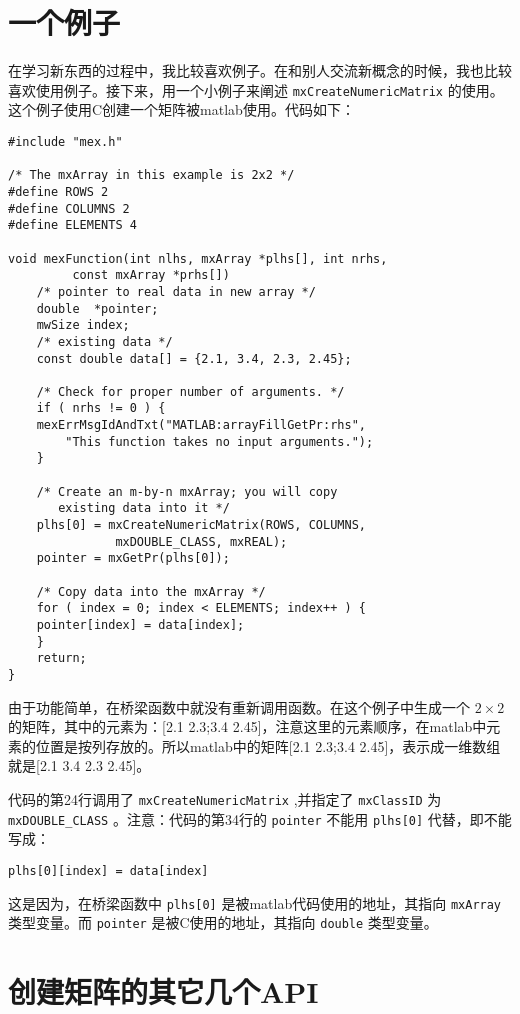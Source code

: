 \documentclass[10pt,a4paper,UTF8]{article}
\begin{document}
\section{一个例子}
\label{sec:orgheadline3}


在学习新东西的过程中，我比较喜欢例子。在和别人交流新概念的时候，我也比较喜欢使用例子。接下来，用一个小例子来阐述 \texttt{mxCreateNumericMatrix} 的使用。这个例子使用C创建一个矩阵被matlab使用。代码如下：
\lstset{language=C,label= ,caption= ,captionpos=b,numbers=left}
\begin{lstlisting}
#include "mex.h"

/* The mxArray in this example is 2x2 */
#define ROWS 2
#define COLUMNS 2
#define ELEMENTS 4

void mexFunction(int nlhs, mxArray *plhs[], int nrhs,
		 const mxArray *prhs[])
    /* pointer to real data in new array */
    double  *pointer;
    mwSize index;
    /* existing data */
    const double data[] = {2.1, 3.4, 2.3, 2.45};

    /* Check for proper number of arguments. */
    if ( nrhs != 0 ) {
	mexErrMsgIdAndTxt("MATLAB:arrayFillGetPr:rhs",
	    "This function takes no input arguments.");
    }

    /* Create an m-by-n mxArray; you will copy
       existing data into it */
    plhs[0] = mxCreateNumericMatrix(ROWS, COLUMNS,
			   mxDOUBLE_CLASS, mxREAL);
    pointer = mxGetPr(plhs[0]);

    /* Copy data into the mxArray */
    for ( index = 0; index < ELEMENTS; index++ ) {
	pointer[index] = data[index];
    }
    return;
}
\end{lstlisting}

由于功能简单，在桥梁函数中就没有重新调用函数。在这个例子中生成一个 \(2\times 2\)的矩阵，其中的元素为：[2.1 2.3;3.4 2.45]，注意这里的元素顺序，在matlab中元素的位置是按列存放的。所以matlab中的矩阵[2.1 2.3;3.4 2.45]，表示成一维数组就是[2.1 3.4 2.3 2.45]。

代码的第24行调用了 \texttt{mxCreateNumericMatrix} ,并指定了 \texttt{mxClassID}  为 \texttt{mxDOUBLE\_CLASS} 。注意：代码的第34行的 \texttt{pointer} 不能用 \texttt{plhs[0]} 代替，即不能写成：
\lstset{language=C,label= ,caption= ,captionpos=b,numbers=none}
\begin{lstlisting}
plhs[0][index] = data[index]
\end{lstlisting}
这是因为，在桥梁函数中 \texttt{plhs[0]} 是被matlab代码使用的地址，其指向 \texttt{mxArray} 类型变量。而  \texttt{pointer} 是被C使用的地址，其指向 \texttt{double} 类型变量。
\section{创建矩阵的其它几个API}
\label{sec:orgheadline7}
\end{document}
